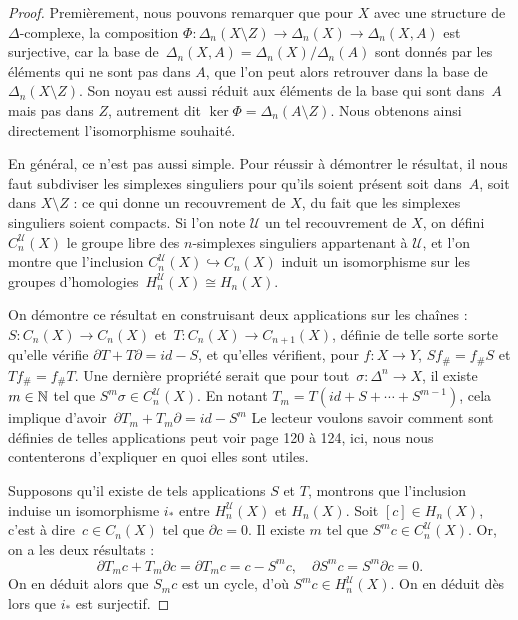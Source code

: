 \begin{proof}
Premièrement, nous pouvons remarquer que pour $X$ avec une structure de $\Delta$-complexe, la composition $\Phi:\Delta_n(X\setminus Z)\to \Delta_n(X)\to \Delta_n(X,A)$ est surjective, car la base de~$\Delta_n(X,A)=\Delta_n(X)/\Delta_n(A)$ sont donnés par les éléments qui ne sont pas dans $A$, que l'on peut alors retrouver dans la base de~$\Delta_n(X\setminus Z)$. Son noyau est aussi réduit aux éléments de la base qui sont dans~$A$ mais pas dans $Z$, autrement dit $\ker\Phi=\Delta_n(A\setminus Z)$. Nous obtenons ainsi directement l'isomorphisme souhaité. 

En général, ce n'est pas aussi simple. Pour réussir à démontrer le résultat, il nous faut subdiviser les simplexes singuliers pour qu'ils soient présent soit dans~$A$, soit dans $X\setminus Z$ : ce qui donne un recouvrement de $X$, du fait que les simplexes singuliers soient compacts. Si l'on note $\mathcal{U}$ un tel recouvrement de $X$, on défini $C_n^\mathcal{U}(X)$ le groupe libre des $n$-simplexes singuliers appartenant à $\mathcal{U}$, et l'on montre que l'inclusion $C_n^\mathcal{U}(X)\hookrightarrow C_n(X)$ induit un isomorphisme sur les groupes d'homologies~${H_n^\mathcal{U}(X)\cong H_n(X)}$.

On démontre ce résultat en construisant deux applications sur les chaînes : ${S:C_n(X)\to C_n(X)}$ et~${T:C_n(X)\to C_{n+1}(X)}$, définie de telle sorte sorte qu'elle vérifie $\partial T+T\partial=id-S$, et qu'elles vérifient, pour $f:X\to Y$, $Sf_\#=f_\#S$ et $Tf_\#=f_\#T$. Une dernière propriété serait que pour tout~$\sigma:\Delta^n\to X$, il existe $m\in\mathbb{N}$ tel que $S^m\sigma\in C_n^\mathcal{U}(X)$. En notant $T_m=T(id+S+\cdots+S^{m-1})$, cela implique d'avoir~$\partial T_m+T_m\partial=id-S^m$ Le lecteur voulons savoir comment sont définies de telles applications peut voir \cite{Hatcher} page 120 à 124, ici, nous nous contenterons d'expliquer en quoi elles sont utiles.

\bigskip Supposons qu'il existe de tels applications $S$ et $T$, montrons que l'inclusion induise un isomorphisme $i_\ast$ entre $H_n^\mathcal{U}(X)$ et $H_n(X)$. Soit $[c]\in H_n(X)$, c'est à dire~$c\in C_n(X)$ tel que $\partial c=0$. Il existe $m$ tel que $S^mc\in C_n^\mathcal{U}(X)$. Or, on a les deux résultats : $$\partial T_mc+T_m\partial c=\partial T_mc=c-S^mc,\quad \partial S^mc=S^m\partial c=0.$$On en déduit alors que $S_mc$ est un cycle, d'où $S^mc\in H_n^\mathcal{U}(X)$. On en déduit dès lors que $i_\ast$ est surjectif.


\end{proof}
